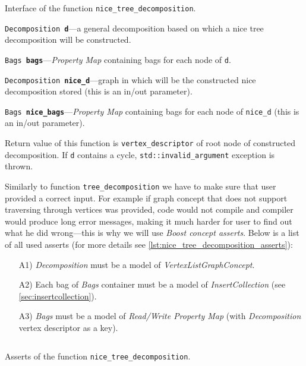 \documentclass[thesis=B,english]{FITthesis}[2019/03/21]
\begin{document}
\begin{listing}[H]
	\inputminted[tabsize=2,breaklines,bgcolor=codebg]{c++}{snippets/nice_tree_decomposition_interface.m}
	\caption[Interface of the function \texttt{nice\_tree\_decomposition}]{Interface of the function \texttt{nice\_tree\_decomposition}.}
	\label{lst:nice_tree_decomposition_interface}
\end{listing}

\noindent\texttt{Decomposition \textbf{d}}---a general decomposition based on which a nice tree decomposition will be constructed.

\noindent\texttt{Bags \textbf{bags}}---\emph{Property Map} containing bags for each node of \texttt{d}.

\noindent\texttt{Decomposition \textbf{nice\_d}}---graph in which will be the constructed nice decomposition stored (this is an in/out parameter).

\noindent\texttt{Bags \textbf{nice\_bags}}---\emph{Property Map} containing bags for each node of \texttt{nice\_d} (this is an in/out parameter).

Return value of this function is \texttt{vertex\_descriptor} of root node of constructed decomposition. If \texttt{d} contains a cycle, \texttt{std::invalid\_argument} exception is thrown.

Similarly to function \texttt{tree\_decomposition} we have to make sure that user provided a correct input. For example if graph concept that does not support traversing through vertices was provided, code would not compile and compiler would produce long error messages, making it much harder for user to find out what he did wrong---this is why we will use \emph{Boost concept asserts}. Below is a list of all used asserts (for more details see \autoref{lst:nice_tree_decomposition_asserts}):

\begin{itemize}
	\item [A1)] \emph{Decomposition} must be a model of \emph{VertexListGraphConcept}.
	\item [A2)] Each bag of \emph{Bags} container must be a model of \emph{InsertCollection} (see \autoref{sec:insertcollection}).
	\item [A3)] \emph{Bags} must be a model of \emph{Read/Write Property Map} (with \emph{Decomposition} vertex descriptor as a key).
\end{itemize}

\begin{listing}[H]
	\inputminted[tabsize=2,breaklines,bgcolor=codebg]{c++}{snippets/nice_tree_decomposition_asserts.m}
	\caption[Asserts of the function \texttt{nice\_tree\_decomposition}]{Asserts of the function \texttt{nice\_tree\_decomposition}.}
	\label{lst:nice_tree_decomposition_asserts}
\end{listing}
\end{document}
